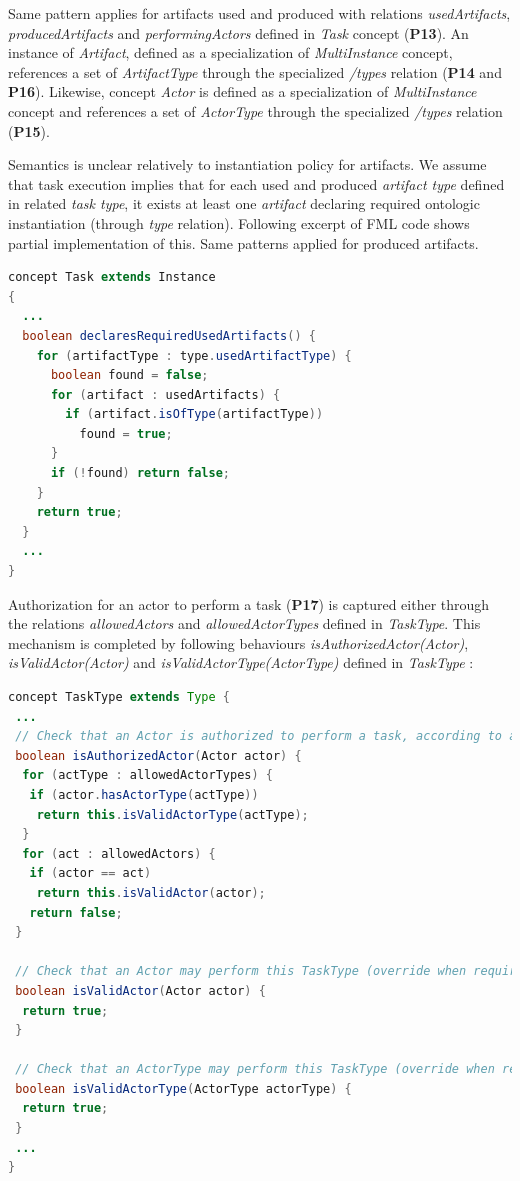 Same pattern applies for artifacts used and produced with relations \textit{usedArtifacts}, \textit{producedArtifacts} and \textit{performingActors} defined in \textit{Task} concept (\textbf{P13}). An instance of \textit{Artifact}, defined as a specialization of \textit{MultiInstance} concept, references a set of \textit{ArtifactType} through the specialized \textit{/types} relation (\textbf{P14} and \textbf{P16}). Likewise, concept \textit{Actor} is defined as a specialization of \textit{MultiInstance} concept and references a set of \textit{ActorType} through the specialized \textit{/types} relation (\textbf{P15}).

Semantics is unclear relatively to instantiation policy for artifacts. We assume that task execution implies that for each used and produced \textit{artifact type} defined in related \textit{task type}, it exists at least one \textit{artifact} declaring required ontologic instantiation (through \textit{type} relation). Following excerpt of FML code shows partial implementation of this. Same patterns applied for produced artifacts.

\begin{lstlisting}[breaklines=true, language=java, basicstyle=\ttfamily\scriptsize, mathescape=true] 
concept Task extends Instance 
{
  ...
  boolean declaresRequiredUsedArtifacts() {
    for (artifactType : type.usedArtifactType) {
      boolean found = false;
      for (artifact : usedArtifacts) {
        if (artifact.isOfType(artifactType))
          found = true;
      }
      if (!found) return false;
    }
    return true;
  }
  ...
}    
\end{lstlisting}

Authorization for an actor to perform a task (\textbf{P17}) is captured either through the relations \textit{allowedActors} and \textit{allowedActorTypes} defined in \textit{TaskType}. This mechanism is completed by following behaviours \textit{isAuthorizedActor(Actor)}, \textit{isValidActor(Actor)} and \textit{isValidActorType(ActorType)} defined in \textit{TaskType} : 

\begin{lstlisting}[breaklines=true, language=java, basicstyle=\ttfamily\scriptsize, mathescape=true]
concept TaskType extends Type {
 ...
 // Check that an Actor is authorized to perform a task, according to allowed Actor and ActorTypes
 boolean isAuthorizedActor(Actor actor) {      
  for (actType : allowedActorTypes) {        
   if (actor.hasActorType(actType))         
    return this.isValidActorType(actType);          
  }        
  for (act : allowedActors) {        
   if (actor == act)         
    return this.isValidActor(actor);          
   return false;      
 }
  
 // Check that an Actor may perform this TaskType (override when required)
 boolean isValidActor(Actor actor) {
  return true;
 }

 // Check that an ActorType may perform this TaskType (override when required)
 boolean isValidActorType(ActorType actorType) {
  return true;
 }
 ...
}
\end{lstlisting}

